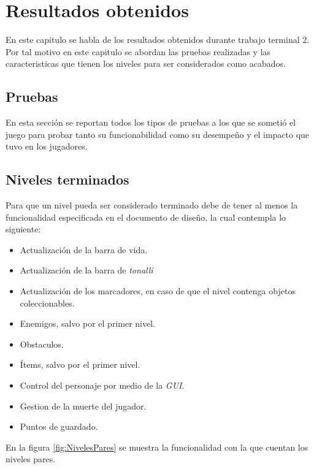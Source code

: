 \chapter{Resultados obtenidos}
En este capitulo se habla de los resultados obtenidos durante trabajo terminal 2. 
Por tal motivo en este capitulo se abordan las pruebas realizadas y las 
caracteristicas que tienen los niveles para ser considerados como acabados.

\section{Pruebas}
En esta sección se reportan todos los tipos de pruebas a los que se sometió el 
juego para probar tanto su funcionabilidad como su desempeño y el impacto que 
tuvo en los jugadores.

%







\section{Niveles terminados}
Para que un nivel pueda ser considerado terminado debe de tener al menos la 
funcionalidad especificada en el documento de diseño, la cual contempla lo 
siguiente: 
\begin{itemize}
	\item Actualización de la barra de vida.
	\item Actualización de la barra de \textit{tonalli}
	\item Actualización de los marcadores, en caso de que el nivel contenga objetos 
	coleccionables.
	\item Enemigos, salvo por el primer nivel.
	\item Obstaculos.
	\item Ítems, salvo por el primer nivel.
	\item Control del personaje por medio de la \textit{GUI}.
	\item Gestion de la muerte del jugador.
	\item Puntos de guardado.
\end{itemize} 

En la figura \ref{fig:NivelesPares} se muestra la funcionalidad con la que cuentan los niveles pares.
		
